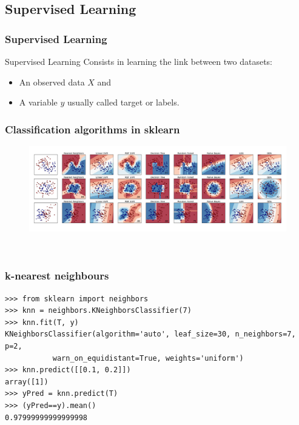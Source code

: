 \documentclass[10pt, colorlinks]{beamer}
\begin{document}

\subsection{Supervised Learning} %
\label{sec:Classfication}
\begin{frame}[fragile]\frametitle{Supervised Learning}
\begin{block}{Supervised Learning}
Consists in learning the link between two datasets:
\begin{itemize}
    \item An observed data $X$ and
    \item  A variable $y$ usually called target or labels. 
\end{itemize}
\end{block}
\end{frame}





\begin{frame}[fragile]\frametitle{Classification algorithms in sklearn}
\begin{center}
 \begin{figure}[!htb]
   
   
\centering    \includegraphics[width=1.1\textwidth]{figs/classifiers}
\end{figure}
\end{center} 
\
\end{frame}



\begin{frame}[fragile]\frametitle{k-nearest neighbours }
\begin{verbatim}
>>> from sklearn import neighbors
>>> knn = neighbors.KNeighborsClassifier(7)
>>> knn.fit(T, y)
KNeighborsClassifier(algorithm='auto', leaf_size=30, n_neighbors=7, p=2,
           warn_on_equidistant=True, weights='uniform')
>>> knn.predict([[0.1, 0.2]])
array([1])
>>> yPred = knn.predict(T)
>>> (yPred==y).mean()
0.97999999999999998
\end{verbatim}

\end{frame}
\end{document}
